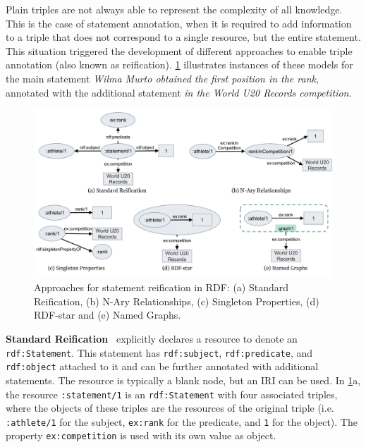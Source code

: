 
Plain triples are not always able to represent the complexity of all knowledge. This is the case of statement annotation, when it is required to add information to a triple that does not correspond to a single resource, but the entire statement. This situation triggered the development of different approaches to enable triple annotation (also known as reification). \cref{fig:chp2_reification} illustrates instances of these models for the main statement \textit{Wilma Murto obtained the first position in the rank}, annotated with the additional statement \textit{in the World U20 Records competition}. 

\begin{figure}[t]
\centering
\includegraphics[width=\linewidth]{figures/chp2_reifications.pdf}
\caption[Approaches for statement reification in RDF]{Approaches for statement reification in RDF: (a) Standard Reification, (b) N-Ary Relationships, (c) Singleton Properties, (d) RDF-star and (e) Named Graphs.}
\label{fig:chp2_reification}
\end{figure}

\noindent\textbf{Standard Reification}~\parencite{lassila1999rdf} explicitly declares a resource to denote an \texttt{rdf:Statement}.
This statement has \texttt{rdf:subject}, \texttt{rdf:predicate}, and \texttt{rdf:object} attached to it and can be further annotated with additional statements. 
The resource is typically a blank node, but an IRI can be used. 
In \cref{fig:chp2_reification}a, the resource \texttt{:statement/1} is an \texttt{rdf:Statement} with four associated triples, where the objects of these triples are the resources of the original triple (i.e. \texttt{:athlete/1} for the subject, \texttt{ex:rank} for the predicate, and \texttt{1} for the object). 
The property \texttt{ex:competition} is used with its own value as object.



